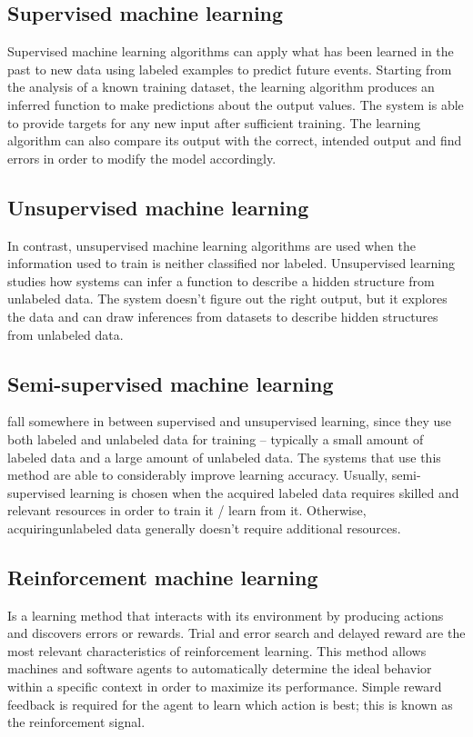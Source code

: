\documentclass[12pt]{article}
\numberwithin{equation}{section}
\numberwithin{table}{section}
\numberwithin{figure}{section}
\begin{document}
\subsection{Supervised machine learning }

Supervised machine learning algorithms can apply what has been learned in the past to new data using labeled examples to predict future events. Starting from the analysis of a known training dataset, the learning algorithm produces an inferred function to make predictions about the output values. The system is able to provide targets for any new input after sufficient training. The learning algorithm can also compare its output with the correct, intended output and find errors in order to modify the model accordingly.

\subsection{Unsupervised machine learning }

In contrast, unsupervised machine learning algorithms are used when the information used to train is neither classified nor labeled. Unsupervised learning studies how systems can infer a function to describe a hidden structure from unlabeled data. The system doesn’t figure out the right output, but it explores the data and can draw inferences from datasets to describe hidden structures from unlabeled data.

\subsection{Semi-supervised machine learning }

 fall somewhere in between supervised and unsupervised learning, since they use both labeled and unlabeled data for training – typically a small amount of labeled data and a large amount of unlabeled data. The systems that use this method are able to considerably improve learning accuracy. Usually, semi-supervised learning is chosen when the acquired labeled data requires skilled and relevant resources in order to train it / learn from it. Otherwise, acquiringunlabeled data generally doesn’t require additional resources.
 
\subsection{Reinforcement machine learning }
Is a learning method that interacts with its environment by producing actions and discovers errors or rewards. Trial and error search and delayed reward are the most relevant characteristics of reinforcement learning. This method allows machines and software agents to automatically determine the ideal behavior within a specific context in order to maximize its performance. Simple reward feedback is required for the agent to learn which action is best; this is known as the reinforcement signal.
\end{document}
